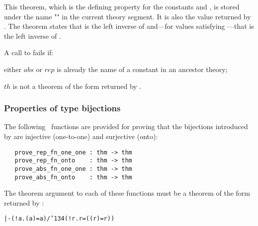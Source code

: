 \noindent This theorem, which is the defining property for the constants
 and , is stored under the name "" in the current theory
segment.  It is also the value returned by .
The theorem states that  is the left inverse of  and---for
values satisfying ---that  is the left inverse of .

A call to
fails if:

\begin{myenumerate}
\item either $abs$ or $rep$ is already the name of a constant in
an ancestor theory;
\item $th$ is not a theorem of the form returned by
.
\end{myenumerate}%

\subsubsection{Properties of type bijections}

The following \ML\ functions are provided for proving that the bijections
introduced by  are injective (one-to-one)
and surjective (onto):

\begin{boxed}
\begin{verbatim}
   prove_rep_fn_one_one : thm -> thm
   prove_rep_fn_onto    : thm -> thm
   prove_abs_fn_one_one : thm -> thm
   prove_abs_fn_onto    : thm -> thm
\end{verbatim}\end{boxed}

\noindent The theorem argument to each of these functions must be a theorem
of the form returned by :

{\def\bk{\char'134}
\begin{hol}\begin{alltt}
   |- (!a. ( a) = a) /\bk (!r.  r = (( r) = r))
\end{alltt}\end{hol}}

